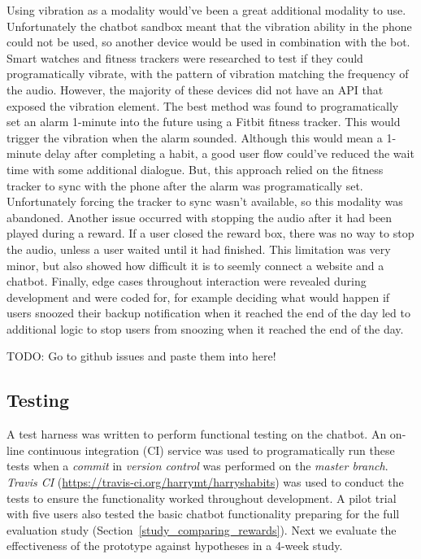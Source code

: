 Using vibration as a modality would've been a great additional modality to use.
Unfortunately the chatbot sandbox meant that the vibration ability in the phone could not be used, so another device would be used in combination with the bot.
Smart watches and fitness trackers were researched to test if they could programatically vibrate, with the pattern of vibration matching the frequency of the audio.
However, the majority of these devices did not have an API that exposed the vibration element. The best method was found to programatically set an alarm 1-minute into the future using a Fitbit fitness tracker.
This would trigger the vibration when the alarm sounded.
Although this would mean a 1-minute delay after completing a habit, a good user flow could've reduced the wait time with some additional dialogue.
But, this approach relied on the fitness tracker to sync with the phone after the alarm was programatically set. Unfortunately forcing the tracker to sync wasn't available, so this modality was abandoned. Another issue occurred with stopping the audio after it had been played during a reward. If a user closed the reward box, there was no way to stop the audio, unless a user waited until it had finished. This limitation was very minor, but also showed how difficult it is to seemly connect a website and a chatbot. Finally, edge cases throughout interaction were revealed during development and were coded for, for example deciding what would happen if users snoozed their backup notification when it reached the end of the day led to additional logic to stop users from snoozing when it reached the end of the day.


TODO: Go to github issues and paste them into here!

\subsection{Testing}
A test harness was written to perform functional testing on the chatbot. An on-line continuous integration (CI) service was used to programatically run these tests when a \textit{commit} in \textit{version control} was performed on the \textit{master branch}. \textit{Travis CI} (\url{https://travis-ci.org/harrymt/harryshabits}) was used to conduct the tests to ensure the functionality worked throughout development. A pilot trial with five users also tested the basic chatbot functionality preparing for the full evaluation study (Section~\ref{study_comparing_rewards}). Next we evaluate the effectiveness of the prototype against hypotheses in a 4-week study.

\newpage